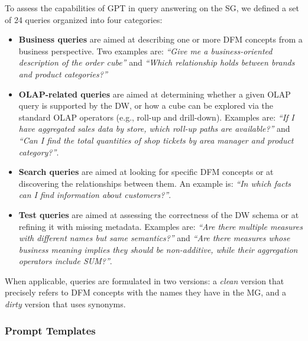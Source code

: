 To assess the capabilities of GPT in query answering on the SG, we defined a set of 24 queries organized into four categories:
\begin{itemize}
    \item \textbf{Business queries} are aimed at describing one or more DFM concepts from a business perspective. Two examples are: \textit{``Give me a business-oriented description of the order cube''} and \textit{``Which relationship holds between brands and product categories?''}
    \item \textbf{OLAP-related queries} are aimed at determining whether a given OLAP query is supported by the DW, or how a cube can be explored via the standard OLAP operators (e.g., roll-up and drill-down). Examples are: \textit{``If I have aggregated sales data by store, which roll-up paths are available?''} and \textit{``Can I find the total quantities of shop tickets by area manager and product category?''}.
    \item \textbf{Search queries} are aimed at looking for specific DFM concepts or at discovering the relationships between them. An example is: \textit{``In which facts can I find information about customers?''}.
    \item \textbf{Test queries} are aimed at assessing the correctness of the DW schema or at refining it with missing metadata. Examples are: \textit{``Are there multiple measures with different names but same semantics?''} and \textit{``Are there measures whose business meaning implies they should be non-additive, while their aggregation operators include SUM?''}.
\end{itemize}

When applicable, queries are formulated in two versions: a \textit{clean} version that precisely refers to DFM concepts with the names they have in the MG, and a \textit{dirty} version that uses synonyms.

\subsubsection{Prompt Templates}
\label{sec:llm-templates}

